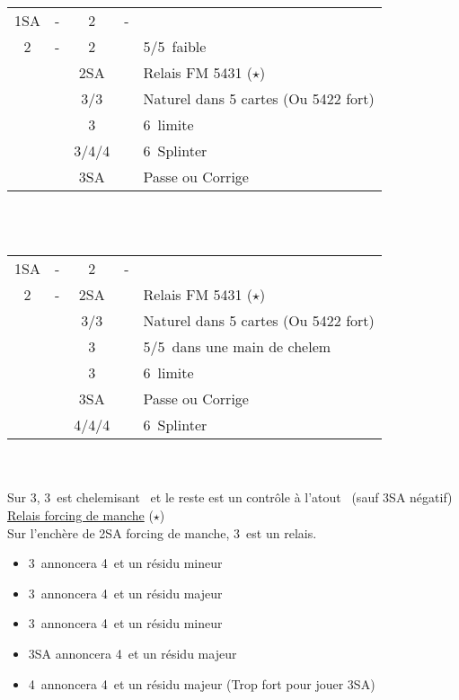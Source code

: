 \documentclass[a4paper, oneside, 11pt]{report}
\begin{document}
		\begin{tabular}{cccc|l}
		1SA & - & 2\carreau & - &\\
		2\coeur & - & 2\pique && 5\coeur/5\pique\ faible\\
		&& 2SA && Relais FM 5431 ($\star$)\\
		&& 3\trefle/3\carreau && Naturel dans 5 cartes (Ou 5422 fort)\\
		&& 3\coeur && 6\coeur\ limite\\
		&& 3\pique/4\trefle/4\carreau && 6\coeur\ Splinter\\
		&& 3SA && Passe ou Corrige\\
		\end{tabular}\\\\
		
		\begin{tabular}{cccc|l}
		1SA & - & 2\coeur & - &\\
		2\pique & - & 2SA && Relais FM 5431 ($\star$)\\
		&& 3\trefle/3\carreau && Naturel dans 5 cartes (Ou 5422 fort)\\
		&& 3\coeur && 5\coeur/5\pique\ dans une main de chelem\\
		&& 3\pique && 6\pique\ limite\\
		&& 3SA && Passe ou Corrige\\
		&& 4\trefle/4\carreau/4\coeur && 6\pique\ Splinter\\
		\end{tabular}\\\\
		Sur 3\coeur,  3\pique\ est chelemisant \pique\ et le reste est un contrôle à l'atout \coeur\ (sauf 3SA négatif)\\
	
		\underline{Relais forcing de manche} ($\star$)\\
		Sur l'enchère de 2SA forcing de manche, 3\trefle\ est un relais.
		\begin{itemize}
		\item 3\carreau\ annoncera 4\trefle\ et un résidu mineur
		\item 3\coeur\ annoncera 4\trefle\ et un résidu majeur
		\item 3\pique\ annoncera 4\carreau\ et un résidu mineur
		\item 3SA annoncera 4\carreau\ et un résidu majeur
		\item 4\trefle\ annoncera 4\carreau\ et un résidu majeur (Trop fort pour jouer 3SA)
		\end{itemize}
\end{document}
